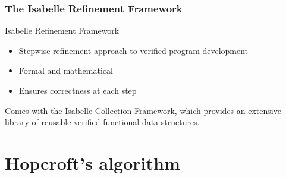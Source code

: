 \documentclass{beamer}
\theoremstyle{definition}
\begin{document}
\begin{frame}
  \frametitle{The Isabelle Refinement Framework}


  \begin{block}{Isabelle Refinement Framework}
    \begin{itemize}
      \item Stepwise refinement approach to verified program development
      \item Formal and mathematical
      \item Ensures correctness at each step
    \end{itemize}
  \end{block}
  Comes with the Isabelle Collection Framework, which provides an extensive library of reusable verified functional data structures.
\end{frame}

\section{Hopcroft's algorithm}

\begin{frame}
    \tableofcontents[currentsection]
\end{frame}
\end{document}

